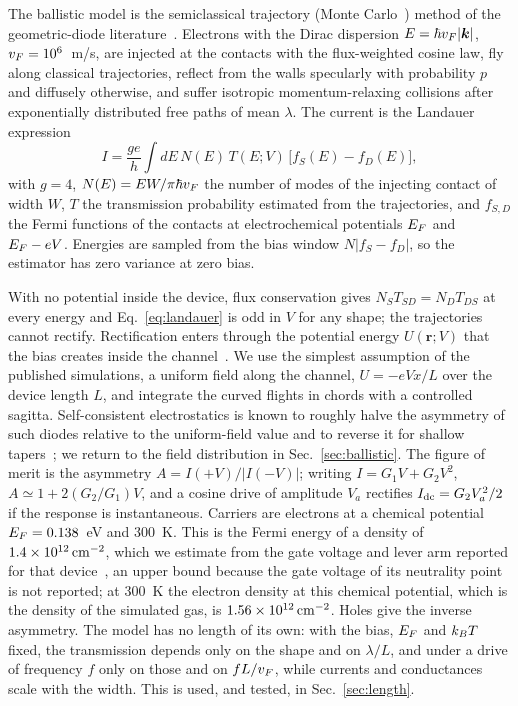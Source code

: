 The ballistic model is the semiclassical trajectory (Monte
Carlo~\cite{jacoboni1983monte}) method of the geometric-diode
literature~\cite{zhu2013graphene,stearns2021simulation,truccolo2024comprehensive}.
Electrons with the Dirac dispersion $E=\hbar v_{F}|\bm{k}|$,
$v_{F}=10^{6}$~m/s, are injected at the contacts with the flux-weighted cosine
law, fly along classical trajectories, reflect from the walls specularly with
probability $p$ and diffusely otherwise, and suffer isotropic
momentum-relaxing collisions after exponentially distributed free paths of
mean $\lambda$. The current is the Landauer expression
\begin{equation}
I=\frac{g e}{h}\int dE\,N(E)\,T(E;V)\,\bigl[f_{S}(E)-f_{D}(E)\bigr],
\label{eq:landauer}
\end{equation}
with $g=4$, $N(E)=EW/\pi\hbar v_{F}$ the number of modes of the injecting contact
of width $W$, $T$ the transmission probability estimated from the
trajectories, and $f_{S,D}$ the Fermi functions of the contacts at
electrochemical potentials $E_{F}$ and $E_{F}-eV$. Energies are sampled from the
bias window $N|f_{S}-f_{D}|$, so the estimator has zero variance at zero bias.

With no potential inside the device, flux conservation gives
$N_{S}T_{SD}=N_{D}T_{DS}$ at every energy and Eq.~\eqref{eq:landauer} is odd
in $V$ for any shape; the trajectories cannot rectify. Rectification enters
through the potential energy $U(\bm{r};V)$ that the bias creates inside the
channel~\cite{christen1996gauge}. We use the simplest assumption of the published
simulations, a uniform field along the channel, $U=-eVx/L$ over the device
length $L$, and integrate the curved flights in chords with a controlled
sagitta. Self-consistent electrostatics is known to roughly halve the
asymmetry of such diodes relative to the uniform-field value and to
reverse it for shallow tapers~\cite{truccolo2024comprehensive}; we return
to the field distribution in Sec.~\ref{sec:ballistic}. The figure of merit is the asymmetry $A=I(+V)/|I(-V)|$; writing
$I=G_{1}V+G_{2}V^{2}$, $A\simeq 1+2(G_{2}/G_{1})V$, and a cosine drive of
amplitude $V_{a}$ rectifies $I_{\mathrm{dc}}=G_{2}V_{a}^{2}/2$ if the response is
instantaneous. Carriers are electrons at a chemical potential
$E_{F}=0.138$~eV and $300$~K. This is the Fermi energy of a density of
$1.4\times10^{12}\,\mathrm{cm^{-2}}$, which we estimate from the gate voltage and
lever arm reported for that device~\cite{nguyen2021geometric}, an upper
bound because the gate voltage of its neutrality point is not reported;
at $300$~K the electron density at this chemical potential, which is the
density of the simulated gas, is $1.56\times10^{12}\,\mathrm{cm^{-2}}$. Holes give
the inverse asymmetry. The model has no length of its own: with the
bias, $E_{F}$ and $k_{B} T$ fixed, the transmission depends only on the shape
and on $\lambda/L$, and under a drive of frequency $f$ only on those and on
$fL/v_{F}$, while currents and conductances scale with the width. This is
used, and tested, in Sec.~\ref{sec:length}.

